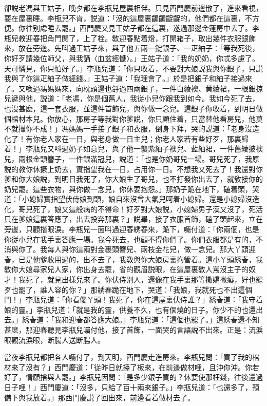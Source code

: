 卻説老馮與王姑子，晚夕都在李瓶兒屋裏相伴。只見西門慶前邊散了，進來看視，要在屋裏睡。李瓶兒不肯，説道：「沒的這屋裏齷齷齪齪的，他們都在這裏，不方便。你往别䖏睡去罷。」西門慶又見王姑子都在這裏，遂過那邊金蓮房中去了。李瓶兒教迎春把角門関了，上了栓。敎迎春點着燈，打開箱子，取出幾件衣服銀飾來，放在旁邊。先呌過王姑子來，與了他五兩一錠銀子、一疋紬子：「等我死後，你好歹請幾位師父，與我誦〈血盆經懺〉。」王姑子道：「我的奶奶，你忒多慮了。天可憐見，你只怕好了。」李瓶兒道：「你只收着，不要對大娘説我與你銀子，只説我與了你這疋紬子做經錢。」王姑子道：「我理會了。」於是把銀子和紬子接過來了。又喚過馮媽媽來，向枕頭邊也㧱過四兩銀子，一件白綾襖、黄綾裙，一根銀掠兒遞與他，説道：「老馮，你是個舊人，我従小兒你跟我到如今。我如今死了去，也沒甚麽，這一套衣服，並這件首飾兒，與你做一念兒。這銀子你收着，到明日做個棺材本兒。你放心，那房子等我對你爹説，你只顧住着，只當替他看房兒，他莫不就攆你不成！」馮媽媽一手接了銀子和衣服，倒身下拜，哭的説道：「老身沒造化了！有你老人家在一日，與老身做一日主兒；你老人家若有些好歹，那裏歸着！」李瓶兒又呌過奶子如意兒，與了他一襲紫紬子襖兒、藍紬裙，一件舊綾披襖兒，兩根金頭簪子，一件銀滿冠兒，説道：「也是你奶哥兒一場。哥兒死了，我原説的教你休撅上奶去，實指望我在一日，占用你一日。不想我又死去了！我還對你爹和你大娘説，到明日我死了，你大娘生了哥兒，也不打發你出去了，就敎接你的奶兒罷。這些衣物，與你做一念兒，你休要抱怨。」那奶子跪在地下，磕着頭，哭道：「小媳婦實指望伏侍娘到頭，娘自來沒曾大氣兒呵着小媳婦。還是小媳婦沒造化，哥兒死了，娘又這般病的不得命！好歹對大娘説，小媳婦男子漢又沒了，死活只在爹娘這裏答應了，出去投奔那裏？」説畢，接了衣服首飾，磕了頭起來，立在旁邊，只顧揩眼淚。李瓶兒一面呌過迎春綉春來，跪下，囑付道：「你兩個，也是你従小兒在我手裏答應一場。我今死去，也顧不得你們了。你們衣服都是有的，不消與你了。我每人與你這兩對金裹頭簪兒、兩枝金花兒，做一念兒。那大丫頭迎春，已是他爹收用過的，出不去了，我敎與你大娘房裏拘管着。這小丫頭綉春，我敎你大娘尋家兒人家，你出身去罷，省的觀眉説眼，在這屋裏敎人罵沒主子的奴才！我死了，就見出樣兒來了。你伏侍别人，還像在我手裏那等撒嬌撇癡，好也罷歹也罷了，誰人容的你？」那綉春跪在地下，哭道：「我娘，我就死也不出這個門！」李瓶兒道：「你看儍丫頭！我死了，你在這屋裏伏侍誰？」綉春道：「我守着娘的靈。」李瓶兒道：「就是我的靈，供養不久，也有個燒的日子。你少不的也還出去。」綉春道：「我和迎春都答應大娘。」李瓶兒道：「這個也罷了。」這綉春還不知甚麽，那迎春聽見李瓶兒囑付他，接了首飾，一面哭的言語説不出來。正是：流淚眼觀流淚眼，断腸人送断腸人。

當夜李瓶兒都把各人囑付了，到天明，西門慶走進房來。李瓶兒問：「買了我的棺材來了沒有？」西門慶道：「従昨日就擡了板來，在前邊做材哩，且沖你沖。你若好了，情願捨與人罷。」李瓶兒因問：「是多少銀子買的？休要使那枉錢，往後還過日子哩！」西門慶道：「沒多，只給了百十兩來銀子。」李瓶兒道：「也還多了，預備下與我放着。」那西門慶説了回出來，前邊看着做材去了。

